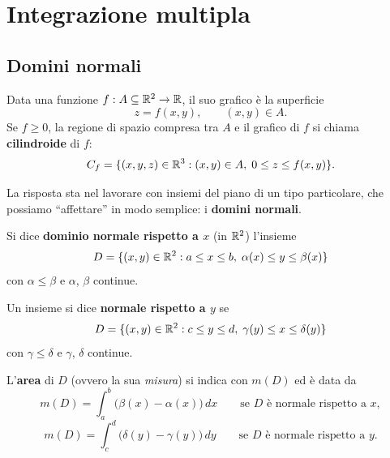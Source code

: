 
\section{Integrazione multipla}

\subsection{Domini normali}

\begin{oss}
    Data una funzione $f : A \subseteq \mathbb{R}^2 \rightarrow \mathbb{R}$, il suo grafico è la superficie
    \[
        z = f(x,y), \qquad (x,y) \in A.
    \]
    Se $f \ge 0$, la regione di spazio compresa tra $A$ e il grafico di $f$ si chiama \textbf{cilindroide} di $f$:
    \[
        C_f = \{ (x,y,z) \in \mathbb{R}^3 : (x,y) \in A,\; 0 \le z \le f(x,y) \}.
    \]
\end{oss}


La risposta sta nel lavorare con insiemi del piano di un tipo particolare, che possiamo ``affettare'' in modo semplice: i \textbf{domini normali}.

\begin{definition}
    Si dice \textbf{dominio normale rispetto a $x$} (in $\mathbb{R}^2$) l'insieme
    \[
        D = \{ (x,y) \in \mathbb{R}^2 : a \le x \le b,\; \alpha(x) \le y \le \beta(x) \}
    \]
    con $\alpha \le \beta$ e $\alpha$, $\beta$ continue.
\end{definition}


\begin{definition}
    Un insieme si dice \textbf{normale rispetto a $y$} se
    \[
        D = \{ (x,y) \in \mathbb{R}^2 : c \le y \le d,\; \gamma(y) \le x \le \delta(y) \}
    \]
    con $\gamma \le \delta$ e $\gamma$, $\delta$ continue.
\end{definition}

\begin{definition}
    L'\textbf{area} di $D$ (ovvero la sua \emph{misura}) si indica con $m(D)$ ed è data da
    \[
        m(D) = \int_a^b \big( \beta(x) - \alpha(x) \big) \,dx
        \qquad \text{se $D$ è normale rispetto a } x,
    \]
    \[
        m(D) = \int_c^d \big( \delta(y) - \gamma(y) \big) \,dy
        \qquad \text{se $D$ è normale rispetto a } y.
    \]
\end{definition}

